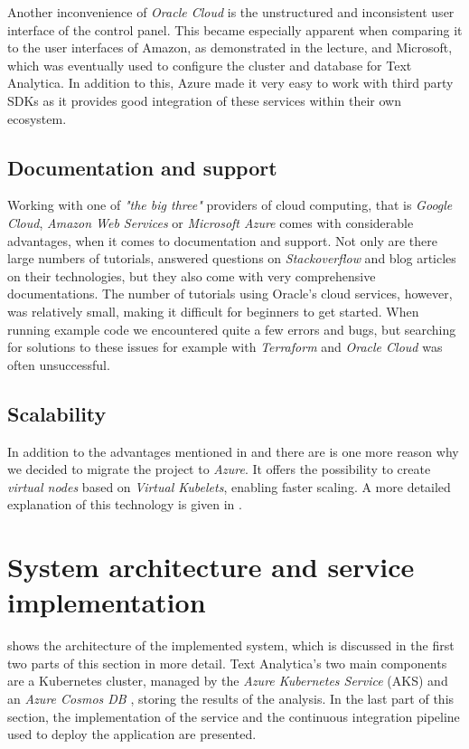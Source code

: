 \documentclass[conference]{IEEEtran}
\begin{document}
Another inconvenience of \textit{Oracle Cloud} is the unstructured and inconsistent user interface of the control panel. This became especially apparent when comparing it to the user interfaces of Amazon, as demonstrated in the lecture, and Microsoft, which was eventually used to configure the cluster and database for Text Analytica. In addition to this, Azure made it very easy to work with third party SDKs as it provides good integration of these services within their own ecosystem.

\subsection{Documentation and support}
\label{subsec:docandsupport}
Working with one of \textit{"the big three"} providers of cloud computing, that is \textit{Google Cloud}, \textit{Amazon Web Services} or \textit{Microsoft Azure} comes with considerable advantages, when it comes to documentation and support. Not only are there large numbers of tutorials, answered questions on \textit{Stackoverflow} and blog articles on their technologies, but they also come with very comprehensive documentations. The number of tutorials using Oracle's cloud services, however, was relatively small, making it difficult for beginners to get started. When running example code we encountered quite a few errors and bugs, but searching for solutions to these issues for example with \textit{Terraform} and \textit{Oracle Cloud} was often unsuccessful.

\subsection{Scalability}
In addition to the advantages mentioned in  and  there are is one more reason why we decided to migrate the project to \textit{Azure}. It offers the possibility to create \textit{virtual nodes} based on \textit{Virtual Kubelets}\cite{VirtualKubelet}, enabling faster scaling. A more detailed explanation of this technology is given in .

\section{System architecture and service implementation}
\label{sec:system-architecture}
 shows the architecture of the implemented system, which is discussed in the first two parts of this section in more detail. Text Analytica’s two main components are a Kubernetes cluster, managed by the \textit{Azure Kubernetes Service} (AKS) \cite{AKS} and an \textit{Azure Cosmos DB} \cite{CosmosDB}, storing the results of the analysis. In the last part of this section, the implementation of the service and the continuous integration pipeline used to deploy the application are presented.
\end{document}
